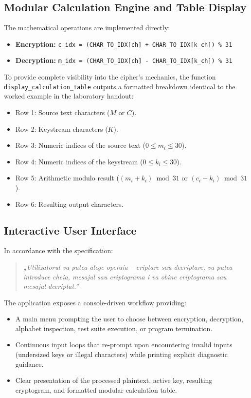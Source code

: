 \documentclass[11pt,a4paper]{article}
\begin{document}
\subsection{Modular Calculation Engine and Table Display}

The mathematical operations are implemented directly:
\begin{itemize}
  \item \textbf{Encryption:} \texttt{c\_idx = (CHAR\_TO\_IDX[ch] + CHAR\_TO\_IDX[k\_ch]) \% 31}
  \item \textbf{Decryption:} \texttt{m\_idx = (CHAR\_TO\_IDX[ch] - CHAR\_TO\_IDX[k\_ch]) \% 31}
\end{itemize}

To provide complete visibility into the cipher's mechanics, the function \texttt{display\_calculation\_table} outputs a formatted breakdown identical to the worked example in the laboratory handout:
\begin{itemize}
  \item Row 1: Source text characters ($M$ or $C$).
  \item Row 2: Keystream characters ($K$).
  \item Row 3: Numeric indices of the source text ($0 \le m_i \le 30$).
  \item Row 4: Numeric indices of the keystream ($0 \le k_i \le 30$).
  \item Row 5: Arithmetic modulo result ($(m_i + k_i) \bmod 31$ or $(c_i - k_i) \bmod 31$).
  \item Row 6: Resulting output characters.
\end{itemize}

\subsection{Interactive User Interface}

In accordance with the specification:
\begin{quote}
  \textit{„Utilizatorul va putea alege operaia -- criptare sau decriptare, va putea introduce cheia, mesajul sau criptograma i va obine criptograma sau mesajul decriptat.”}
\end{quote}

The application exposes a console-driven workflow providing:
\begin{itemize}
  \item A main menu prompting the user to choose between encryption, decryption, alphabet inspection, test suite execution, or program termination.
  \item Continuous input loops that re-prompt upon encountering invalid inputs (undersized keys or illegal characters) while printing explicit diagnostic guidance.
  \item Clear presentation of the processed plaintext, active key, resulting cryptogram, and formatted modular calculation table.
\end{itemize}
\end{document}
